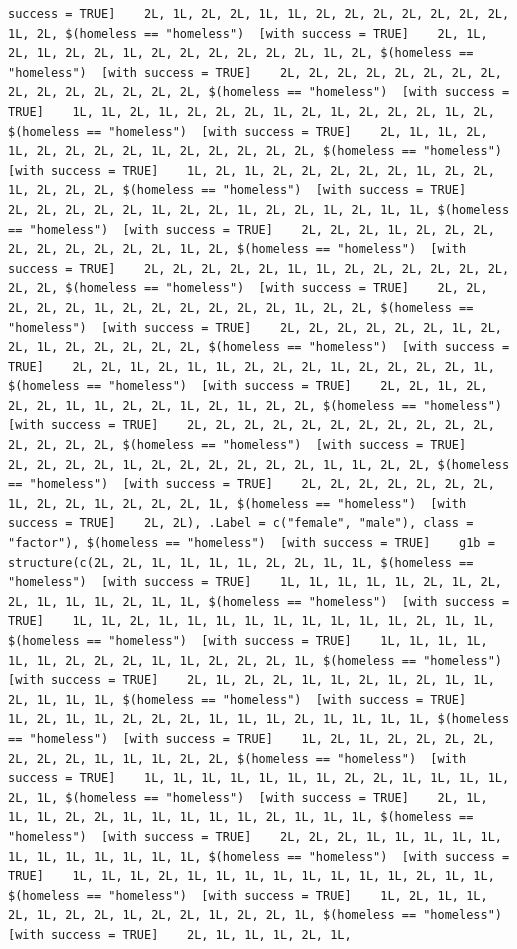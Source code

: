 \documentclass{tufte-book}\usepackage[]{graphicx}\usepackage[]{xcolor}
\makeatletter
\newenvironment{kframe}{%
 \def\at@end@of@kframe{}%
 \ifinner\ifhmode%
  \def\at@end@of@kframe{\end{minipage}}%
  \begin{minipage}{\columnwidth}%
 \fi\fi%
 \def\FrameCommand##1{\hskip\@totalleftmargin \hskip-\fboxsep
 \colorbox{shadecolor}{##1}\hskip-\fboxsep
     \hskip-\linewidth \hskip-\@totalleftmargin \hskip\columnwidth}%
 \MakeFramed {\advance\hsize-\width
   \@totalleftmargin\z@ \linewidth\hsize
   \@setminipage}}%
 {\par\unskip\endMakeFramed%
 \at@end@of@kframe}
\newenvironment{knitrout}{}{} %
\makeatother
\begin{document}
\begin{knitrout}
\begin{kframe}
\begin{verbatim}
success = TRUE]    2L, 1L, 2L, 2L, 1L, 1L, 2L, 2L, 2L, 2L, 2L, 2L, 2L, 1L, 2L, $(homeless == "homeless")  [with success = TRUE]    2L, 1L, 2L, 1L, 2L, 2L, 1L, 2L, 2L, 2L, 2L, 2L, 2L, 1L, 2L, $(homeless == "homeless")  [with success = TRUE]    2L, 2L, 2L, 2L, 2L, 2L, 2L, 2L, 2L, 2L, 2L, 2L, 2L, 2L, 2L, $(homeless == "homeless")  [with success = TRUE]    1L, 1L, 2L, 1L, 2L, 2L, 2L, 1L, 2L, 1L, 2L, 2L, 2L, 1L, 2L, $(homeless == "homeless")  [with success = TRUE]    2L, 1L, 1L, 2L, 1L, 2L, 2L, 2L, 2L, 1L, 2L, 2L, 2L, 2L, 2L, $(homeless == "homeless")  [with success = TRUE]    1L, 2L, 1L, 2L, 2L, 2L, 2L, 2L, 1L, 2L, 2L, 1L, 2L, 2L, 2L, $(homeless == "homeless")  [with success = TRUE]    2L, 2L, 2L, 2L, 2L, 1L, 2L, 2L, 1L, 2L, 2L, 1L, 2L, 1L, 1L, $(homeless == "homeless")  [with success = TRUE]    2L, 2L, 2L, 1L, 2L, 2L, 2L, 2L, 2L, 2L, 2L, 2L, 2L, 1L, 2L, $(homeless == "homeless")  [with success = TRUE]    2L, 2L, 2L, 2L, 2L, 1L, 1L, 2L, 2L, 2L, 2L, 2L, 2L, 2L, 2L, $(homeless == "homeless")  [with success = TRUE]    2L, 2L, 2L, 2L, 2L, 1L, 2L, 2L, 2L, 2L, 2L, 2L, 1L, 2L, 2L, $(homeless == "homeless")  [with success = TRUE]    2L, 2L, 2L, 2L, 2L, 2L, 1L, 2L, 2L, 1L, 2L, 2L, 2L, 2L, 2L, $(homeless == "homeless")  [with success = TRUE]    2L, 2L, 1L, 2L, 1L, 1L, 2L, 2L, 2L, 1L, 2L, 2L, 2L, 2L, 1L, $(homeless == "homeless")  [with success = TRUE]    2L, 2L, 1L, 2L, 2L, 2L, 1L, 1L, 2L, 2L, 1L, 2L, 1L, 2L, 2L, $(homeless == "homeless")  [with success = TRUE]    2L, 2L, 2L, 2L, 2L, 2L, 2L, 2L, 2L, 2L, 2L, 2L, 2L, 2L, 2L, $(homeless == "homeless")  [with success = TRUE]    2L, 2L, 2L, 2L, 1L, 2L, 2L, 2L, 2L, 2L, 2L, 1L, 1L, 2L, 2L, $(homeless == "homeless")  [with success = TRUE]    2L, 2L, 2L, 2L, 2L, 2L, 2L, 1L, 2L, 2L, 1L, 2L, 2L, 2L, 1L, $(homeless == "homeless")  [with success = TRUE]    2L, 2L), .Label = c("female", "male"), class = "factor"), $(homeless == "homeless")  [with success = TRUE]    g1b = structure(c(2L, 2L, 1L, 1L, 1L, 1L, 2L, 2L, 1L, 1L, $(homeless == "homeless")  [with success = TRUE]    1L, 1L, 1L, 1L, 1L, 2L, 1L, 2L, 2L, 1L, 1L, 1L, 2L, 1L, 1L, $(homeless == "homeless")  [with success = TRUE]    1L, 1L, 2L, 1L, 1L, 1L, 1L, 1L, 1L, 1L, 1L, 1L, 2L, 1L, 1L, $(homeless == "homeless")  [with success = TRUE]    1L, 1L, 1L, 1L, 1L, 1L, 2L, 2L, 2L, 1L, 1L, 2L, 2L, 2L, 1L, $(homeless == "homeless")  [with success = TRUE]    2L, 1L, 2L, 2L, 1L, 1L, 2L, 1L, 2L, 1L, 1L, 2L, 1L, 1L, 1L, $(homeless == "homeless")  [with success = TRUE]    1L, 2L, 1L, 1L, 2L, 2L, 2L, 1L, 1L, 1L, 2L, 1L, 1L, 1L, 1L, $(homeless == "homeless")  [with success = TRUE]    1L, 2L, 1L, 2L, 2L, 2L, 2L, 2L, 2L, 2L, 1L, 1L, 1L, 2L, 2L, $(homeless == "homeless")  [with success = TRUE]    1L, 1L, 1L, 1L, 1L, 1L, 1L, 2L, 2L, 1L, 1L, 1L, 1L, 2L, 1L, $(homeless == "homeless")  [with success = TRUE]    2L, 1L, 1L, 1L, 2L, 2L, 1L, 1L, 1L, 1L, 1L, 2L, 1L, 1L, 1L, $(homeless == "homeless")  [with success = TRUE]    2L, 2L, 2L, 1L, 1L, 1L, 1L, 1L, 1L, 1L, 1L, 1L, 1L, 1L, 1L, $(homeless == "homeless")  [with success = TRUE]    1L, 1L, 1L, 2L, 1L, 1L, 1L, 1L, 1L, 1L, 1L, 1L, 2L, 1L, 1L, $(homeless == "homeless")  [with success = TRUE]    1L, 2L, 1L, 1L, 2L, 1L, 2L, 2L, 1L, 2L, 2L, 1L, 2L, 2L, 1L, $(homeless == "homeless")  [with success = TRUE]    2L, 1L, 1L, 1L, 2L, 1L, 
\end{verbatim}
\end{kframe}
\end{knitrout}
\end{document}
